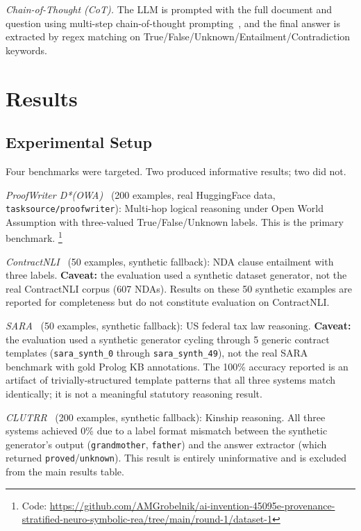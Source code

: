 \documentclass[11pt,letterpaper]{article}
\begin{document}
\textit{Chain-of-Thought (CoT).} The LLM is prompted with the full document and question using multi-step chain-of-thought prompting~\citep{Wei2022}, and
the final answer is extracted by regex matching on True/False/Unknown/Entailment/Contradiction keywords.

\section{Results}
\label{sec:results}

\subsection{Experimental Setup}

Four benchmarks were targeted. Two produced informative results; two did not.

\textit{ProofWriter D*(OWA)}~\citep{Tafjord2021} (200 examples, real HuggingFace data, \texttt{tasksource/proofwriter}): Multi-hop logical reasoning under Open World Assumption with three-valued True/False/Unknown labels. This is the primary benchmark.
\footnote{Code: \url{https://github.com/AMGrobelnik/ai-invention-45095e-provenance-stratified-neuro-symbolic-rea/tree/main/round-1/dataset-1}}

\textit{ContractNLI}~\citep{Koreeda2021} (50 examples, synthetic fallback): NDA clause entailment with three labels. \textbf{Caveat:} the evaluation
used a synthetic dataset generator, not the real ContractNLI corpus (607 NDAs). Results on these 50 synthetic examples
are reported for completeness but do not constitute evaluation on ContractNLI.

\textit{SARA}~\citep{Holzenberger2020} (50 examples, synthetic fallback): US federal tax law reasoning. \textbf{Caveat:} the evaluation used a synthetic generator cycling through 5 generic
contract templates (\texttt{sara\_synth\_0} through \texttt{sara\_synth\_49}), not the real SARA benchmark with gold Prolog KB annotations.
The 100\% accuracy reported is an artifact of trivially-structured template patterns that all three systems match identically;
it is not a meaningful statutory reasoning result.

\textit{CLUTRR}~\citep{Sinha2019} (200 examples, synthetic fallback): Kinship reasoning.
All three systems achieved 0\% due to a label format mismatch between the synthetic generator's output (\texttt{grandmother},
\texttt{father}) and the answer extractor (which returned \texttt{proved}/\texttt{unknown}). This result is entirely uninformative and is excluded
from the main results table.
\end{document}
